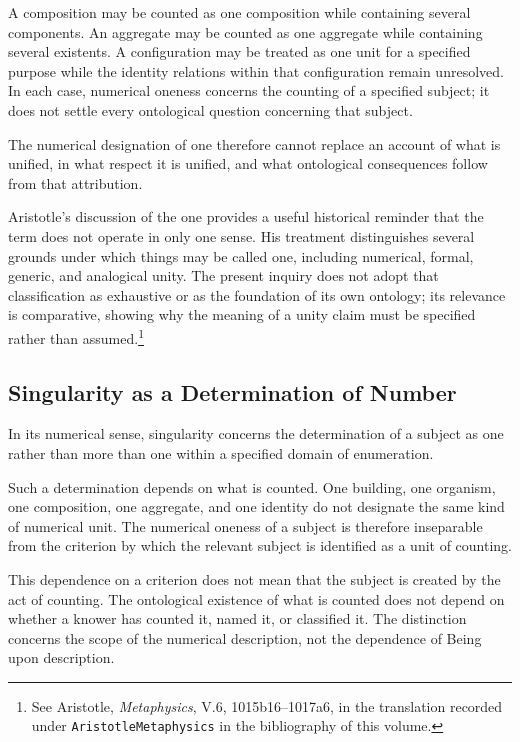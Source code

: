 A composition may be counted as one composition
while containing several components. An aggregate
may be counted as one aggregate while containing
several existents. A configuration may be treated
as one unit for a specified purpose while the
identity relations within that configuration
remain unresolved. In each case, numerical oneness
concerns the counting of a specified subject;
it does not settle every ontological question
concerning that subject.

The numerical designation of one therefore cannot
replace an account of what is unified, in what
respect it is unified, and what ontological
consequences follow from that attribution.

Aristotle's discussion of the one provides a useful
historical reminder that the term does not operate
in only one sense. His treatment distinguishes
several grounds under which things may be called
one, including numerical, formal, generic, and
analogical unity. The present inquiry does not
adopt that classification as exhaustive or as
the foundation of its own ontology; its relevance
is comparative, showing why the meaning of a
unity claim must be specified rather than assumed.\footnote{See Aristotle, \textit{Metaphysics}, V.6, 1015b16--1017a6, in the translation recorded under \texttt{AristotleMetaphysics} in the bibliography of this volume.}

\subsection{Singularity as a Determination of Number}

In its numerical sense, singularity concerns
the determination of a subject as one rather
than more than one within a specified domain
of enumeration.

Such a determination depends on what is counted.
One building, one organism, one composition,
one aggregate, and one identity do not designate
the same kind of numerical unit. The numerical
oneness of a subject is therefore inseparable
from the criterion by which the relevant subject
is identified as a unit of counting.

This dependence on a criterion does not mean
that the subject is created by the act of counting.
The ontological existence of what is counted
does not depend on whether a knower has counted
it, named it, or classified it. The distinction
concerns the scope of the numerical description,
not the dependence of Being upon description.

